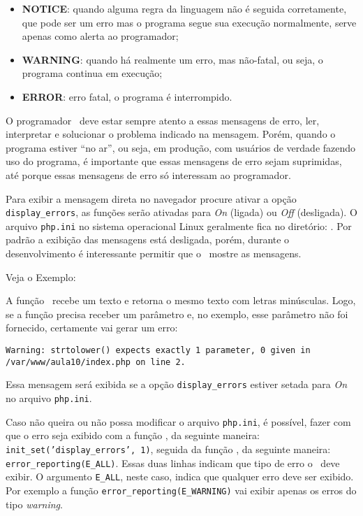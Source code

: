 \begin{itemize}
  \item \textbf{NOTICE}: quando alguma regra da linguagem não é seguida corretamente, 
  que pode ser um erro mas o programa segue sua execução normalmente, serve apenas 
  como alerta ao programador;
  \item \textbf{WARNING}: quando há realmente um erro, mas não-fatal, ou seja, 
  o programa continua em execução;
  \item \textbf{ERROR}: erro fatal, o programa é interrompido.
\end{itemize}

O programador \php~deve estar sempre atento a essas mensagens de erro, ler, interpretar e 
solucionar o problema indicado na mensagem. Porém, quando o programa estiver ``no ar'', 
ou seja, em produção, com usuários de verdade fazendo uso do programa, é importante que 
essas mensagens de erro sejam suprimidas, até porque essas mensagens de erro só interessam 
ao programador.

Para exibir a mensagem direta no navegador procure ativar a opção \texttt{display\_errors}, 
as funções serão ativadas para \textit{On} (ligada) ou \textit{Off} (desligada). O arquivo 
\texttt{php.ini} no sistema operacional Linux geralmente fica no diretório: 
. Por padrão a exibição das mensagens está desligada, porém, 
durante o desenvolvimento é interessante permitir que o \php~mostre as mensagens.

Veja o Exemplo:



A função \funcaostrtolower~recebe um texto e retorna o mesmo texto com letras minúsculas. 
Logo, se a função precisa receber um parâmetro e, no exemplo, esse parâmetro não foi fornecido, 
certamente vai gerar um erro:

\texttt{Warning: strtolower() expects exactly 1 parameter, 0 given in \\ /var/www/aula10/index.php on line 2.}

Essa mensagem será exibida se a opção \texttt{display\_errors} estiver setada para \textit{On} 
no arquivo \texttt{php.ini}.

Caso não queira ou não possa modificar o arquivo \texttt{php.ini}, é possível, fazer com que o erro seja 
exibido com a função \funcaoinitset, da seguinte maneira: \texttt{init\_set('display\_errors', 1)}, 
seguida da função \funcaoerrorreporting, da seguinte maneira: \texttt{error\_reporting(E\_ALL)}. 
Essas duas linhas indicam que tipo de erro o \php~deve exibir. O argumento \texttt{E\_ALL}, neste caso, 
indica que qualquer erro deve ser exibido. Por exemplo a função \texttt{error\_reporting(E\_WARNING)} 
vai exibir apenas os erros do tipo \textit{warning}.

